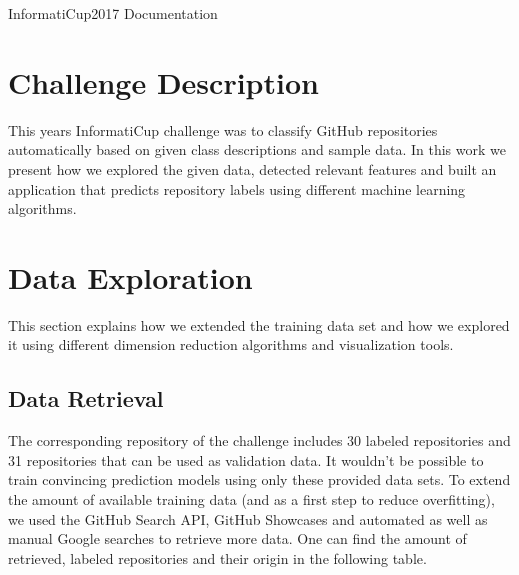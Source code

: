 \documentclass{article}
\begin{document}
InformatiCup2017 Documentation %
\pagebreak

\tableofcontents
\pagebreak

\section{Challenge Description}\label{challenge-description}

This years InformatiCup challenge was to classify GitHub repositories
automatically based on given class descriptions and sample data. In this
work we present how we explored the given data, detected relevant
features and built an application that predicts repository labels using
different machine learning algorithms.

\section{Data Exploration}\label{data-exploration}

This section explains how we extended the training data set and how we
explored it using different dimension reduction algorithms and
visualization tools.

\subsection{Data Retrieval}\label{data-retrieval}

The corresponding repository of the challenge includes 30 labeled
repositories and 31 repositories that can be used as validation data. It
wouldn't be possible to train convincing prediction models using only
these provided data sets. To extend the amount of available training
data (and as a first step to reduce overfitting), we used the GitHub
Search API, GitHub Showcases and automated as well as manual Google
searches to retrieve more data. One can find the amount of retrieved,
labeled repositories and their origin in the following table.
\end{document}
